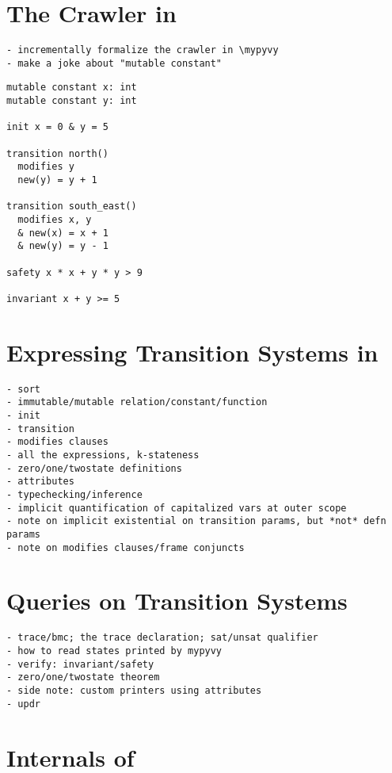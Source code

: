 \section{The Crawler in \mypyvy}

\begin{verbatim}
- incrementally formalize the crawler in \mypyvy
- make a joke about "mutable constant"
\end{verbatim}

\begin{verbatim}
mutable constant x: int
mutable constant y: int

init x = 0 & y = 5

transition north()
  modifies y
  new(y) = y + 1

transition south_east()
  modifies x, y
  & new(x) = x + 1
  & new(y) = y - 1

safety x * x + y * y > 9

invariant x + y >= 5
\end{verbatim}

\section{Expressing Transition Systems in \mypyvy}

\begin{verbatim}
- sort
- immutable/mutable relation/constant/function
- init
- transition
- modifies clauses
- all the expressions, k-stateness
- zero/one/twostate definitions
- attributes
- typechecking/inference
- implicit quantification of capitalized vars at outer scope
- note on implicit existential on transition params, but *not* defn params
- note on modifies clauses/frame conjuncts
\end{verbatim}

\section{Queries on Transition Systems}

\begin{verbatim}
- trace/bmc; the trace declaration; sat/unsat qualifier
- how to read states printed by mypyvy
- verify: invariant/safety
- zero/one/twostate theorem
- side note: custom printers using attributes
- updr
\end{verbatim}

\section{Internals of \mypyvy}

